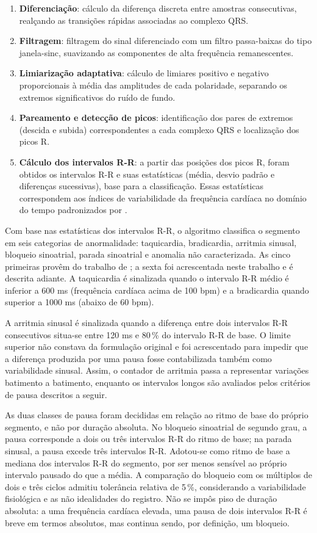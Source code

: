 \begin{enumerate}
    \item \textbf{Diferenciação}: cálculo da diferença discreta entre amostras consecutivas, realçando as transições rápidas associadas ao complexo QRS.
    \item \textbf{Filtragem}: filtragem do sinal diferenciado com um filtro passa-baixas do tipo janela-sinc, suavizando as componentes de alta frequência remanescentes.
    \item \textbf{Limiarização adaptativa}: cálculo de limiares positivo e negativo proporcionais à média das amplitudes de cada polaridade, separando os extremos significativos do ruído de fundo.
    \item \textbf{Pareamento e detecção de picos}: identificação dos pares de extremos (descida e subida) correspondentes a cada complexo QRS e localização dos picos R.
    \item \textbf{Cálculo dos intervalos R-R}: a partir das posições dos picos R, foram obtidos os intervalos R-R e suas estatísticas (média, desvio padrão e diferenças sucessivas), base para a classificação. Essas estatísticas correspondem aos índices de variabilidade da frequência cardíaca no domínio do tempo padronizados por .
\end{enumerate}


Com base nas estatísticas dos intervalos R-R, o algoritmo classifica o segmento em seis categorias de anormalidade: taquicardia, bradicardia, arritmia sinusal, bloqueio sinoatrial, parada sinoatrial e anomalia não caracterizada. As cinco primeiras provêm do trabalho de \cite{moraesFirmwareECG}; a sexta foi acrescentada neste trabalho e é descrita adiante. A taquicardia é sinalizada quando o intervalo R-R médio é inferior a 600 ms (frequência cardíaca acima de 100 bpm) e a bradicardia quando superior a 1000 ms (abaixo de 60 bpm).

A arritmia sinusal é sinalizada quando a diferença entre dois intervalos R-R consecutivos situa-se entre 120 ms e 80\,\% do intervalo R-R de base. O limite superior não constava da formulação original e foi acrescentado para impedir que a diferença produzida por uma pausa fosse contabilizada também como variabilidade sinusal. Assim, o contador de arritmia passa a representar variações batimento a batimento, enquanto os intervalos longos são avaliados pelos critérios de pausa descritos a seguir.

As duas classes de pausa foram decididas em relação ao ritmo de base do próprio segmento, e não por duração absoluta. No bloqueio sinoatrial de segundo grau, a pausa corresponde a dois ou três intervalos R-R do ritmo de base; na parada sinusal, a pausa excede três intervalos R-R. Adotou-se como ritmo de base a mediana dos intervalos R-R do segmento, por ser menos sensível ao próprio intervalo pausado do que a média. A comparação do bloqueio com os múltiplos de dois e três ciclos admitiu tolerância relativa de 5\,\%, considerando a variabilidade fisiológica e as não idealidades do registro. Não se impôs piso de duração absoluta: a uma frequência cardíaca elevada, uma pausa de dois intervalos R-R é breve em termos absolutos, mas continua sendo, por definição, um bloqueio.


